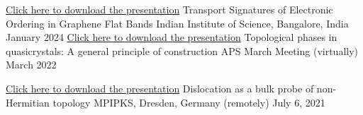 

\begin{cventries}

	\cventry
	{\href{https://drive.google.com/file/d/1OpPcqvn78Uffwwdk_xJLz_MCEl7bEjHX/view?usp=sharing}{Click \underline{here} to download the presentation}} %
	{Transport Signatures of Electronic	Ordering in Graphene Flat Bands} %
	{Indian Institute of Science, Bangalore, India} %
	{January 2024} %
	{
	}
  \cventry
    {\href{https://drive.google.com/file/d/1HrlFGdNeFf5c6VuSyOaXjgsDxlA-f_bh/view?usp=sharing}{Click \underline{here} to download the presentation}} %
    {Topological phases in quasicrystals: A general principle of construction} %
    {APS March Meeting (virtually)} %
    {March 2022} %
    {
    }

  \cventry
	{\href{https://drive.google.com/file/d/18EtxINc68yc_Dt_sxsVkAIQNs8viJxYq/view?usp=sharing}{Click \underline{here} to download the presentation}} %
	{Dislocation as a bulk probe of non-Hermitian topology} %
	{MPIPKS, Dresden, Germany (remotely)} %
	{July 6, 2021} %
	{
	}
\end{cventries}
